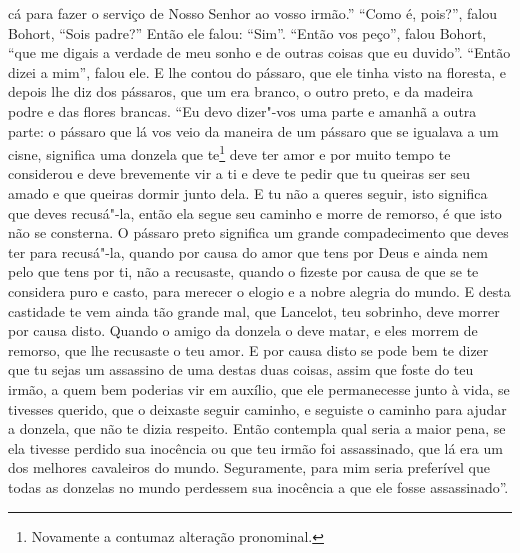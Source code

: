 cá para fazer o serviço de Nosso Senhor ao vosso irmão.” “Como é, pois?”, falou
Bohort, “Sois padre?” Então ele falou: “Sim”. “Então vos peço”, falou Bohort,
“que me digais a verdade de meu sonho e de outras coisas que eu duvido”. “Então
dizei a mim”, falou ele. E lhe contou do pássaro, que ele tinha visto na
floresta, e depois lhe diz dos pássaros, que um era branco, o outro preto, e da
madeira podre e das flores brancas. “Eu devo dizer"-vos uma parte e amanhã a
outra parte: o pássaro que lá vos veio da maneira de um pássaro que se igualava
a um cisne, significa uma donzela que te\footnote{ Novamente a contumaz
alteração pronominal. } deve ter amor e por muito tempo te
considerou e deve brevemente vir a ti e deve te pedir que tu queiras ser seu
amado e que queiras dormir junto dela. E tu não a queres seguir, isto significa
que deves recusá"-la, então ela segue seu caminho e morre de remorso, é que isto
não se consterna. O pássaro preto significa um grande compadecimento que deves
ter para recusá"-la, quando por causa do amor que tens por Deus e ainda nem pelo
que tens por ti, não a recusaste, quando o fizeste por causa de que se te
considera puro e casto, para merecer o elogio e a nobre alegria do mundo. E
desta castidade te vem ainda tão grande mal, que Lancelot, teu sobrinho, deve
morrer por causa disto. Quando o amigo da donzela o deve matar, e eles morrem
de remorso, que lhe recusaste o teu amor. E por causa disto se pode bem te
dizer que tu sejas um assassino de uma destas duas coisas, assim que foste do
teu irmão, a quem bem poderias vir em auxílio, que ele permanecesse junto à
vida, se tivesses querido, que o deixaste seguir caminho, e seguiste o caminho
para ajudar a donzela, que não te dizia respeito. Então contempla qual seria a
maior pena, se ela tivesse perdido sua inocência ou que teu irmão foi
assassinado, que lá era um dos melhores cavaleiros do mundo. Seguramente, para
mim seria preferível que todas as donzelas no mundo perdessem sua inocência a
que ele fosse assassinado”. 

